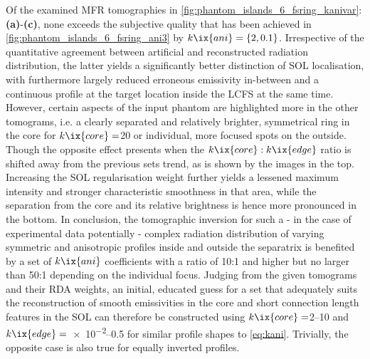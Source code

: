                 Of the examined MFR tomographies in \cref{fig:phantom_islands_6_fsring_kanivar}:\textbf{(a)}-\textbf{(c)}, none exceeds the subjective quality that has been achieved in \cref{fig:phantom_islands_6_fsring_ani3} by $k\ix{ani}=\left\{2, 0.1\right\}$. Irrespective of the quantitative agreement between artificial and reconstructed radiation distribution, the latter yields a significantly better distinction of SOL localisation, with furthermore largely reduced erroneous emissivity in-between and a continuous profile at the target location inside the LCFS at the same time. However, certain aspects of the input phantom are highlighted more in the other tomograms, i.e. a clearly separated and relatively brighter, symmetrical ring in the core for $k\ix{core}=$\SI{20}{\arbitraryunit} or individual, more focused spots on the outside. Though the opposite effect presents when the $k\ix{core}:k\ix{edge}$ ratio is shifted away from the previous sets trend, as is shown by the images in the top. Increasing the SOL regularisation weight further yields a lessened maximum intensity and stronger characteristic smoothness in that area, while the separation from the core and its relative brightness is hence more pronounced in the bottom. In conclusion, the tomographic inversion for such a - in the case of experimental data potentially - complex radiation distribution of varying symmetric and anisotropic profiles inside and outside the separatrix is benefited by a set of $k\ix{ani}$ coefficients with a ratio of 10:1 and higher but no larger than 50:1 depending on the individual focus. Judging from the given tomograms and their RDA weights, an initial, educated guess for a set that adequately suits the reconstruction of smooth emissivities in the core and short connection length features in the SOL can therefore be constructed using $k\ix{core}=$\SIrange{2}{10}{\arbitraryunit} and $k\ix{edge}=$\SIrange{e-2}{0.5}{\arbitraryunit} for similar profile shapes to \cref{eq:kani}. Trivially, the opposite case is also true for equally inverted profiles.%
%
